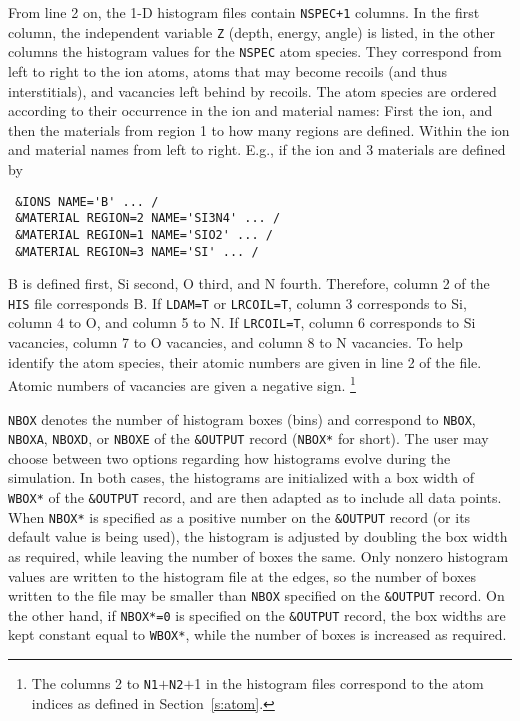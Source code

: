 From line 2 on, the 1-D histogram files contain \texttt{NSPEC+1} columns. In
the first column, the independent variable \texttt{Z} (depth, energy, angle) is 
listed, in the other columns the histogram values for the \texttt{NSPEC} atom
species. They correspond from left to right to the ion atoms, atoms that may
become recoils (and thus interstitials), and vacancies left behind by recoils.
The atom species are ordered according to their occurrence in the ion and
material names: First the ion, and then the materials from region 1 to how many
regions are defined. Within the ion and material names from left to right. 
E.g., if the ion and 3 materials are defined by 
%
\begin{verbatim}
 &IONS NAME='B' ... /
 &MATERIAL REGION=2 NAME='SI3N4' ... /
 &MATERIAL REGION=1 NAME='SIO2' ... /
 &MATERIAL REGION=3 NAME='SI' ... /
\end{verbatim}
%
B is defined first, Si second, O third, and N fourth. Therefore, column 2 of the
\texttt{HIS} file corresponds B. If \texttt{LDAM=T} or \texttt{LRCOIL=T}, column
3 corresponds to Si, column 4 to O, and column 5 to N. If \texttt{LRCOIL=T},
column 6 corresponds to Si vacancies, column 7 to O vacancies, and column 8 to N
vacancies. To help identify the atom species, their atomic numbers are given in
line 2 of the file. Atomic numbers of vacancies are given a negative sign.%
\footnote{The columns 2 to \texttt{N1}$+$\texttt{N2}$+$1 in the histogram files
correspond to the atom indices as defined in Section~\ref{s:atom}.}

\texttt{NBOX} denotes the number of histogram boxes (bins) and correspond to
\texttt{NBOX}, \texttt{NBOXA}, \texttt{NBOXD}, or \texttt{NBOXE} of the
\texttt{\&OUTPUT} record (\texttt{NBOX*} for short). The user may choose between
two options regarding how histograms evolve during the simulation. In both
cases, the histograms are initialized with a box width of \texttt{WBOX*} of the
\texttt{\&OUTPUT} record, and are then adapted as to include all data points.
When \texttt{NBOX*} is specified as a positive number on the \texttt{\&OUTPUT}
record (or its default value is being used), the histogram is adjusted by
doubling the box width as required, while leaving the number of boxes the same.
Only nonzero histogram values are written to the histogram file at the edges, so
the number of boxes written to the file may be smaller than \texttt{NBOX}
specified on the \texttt{\&OUTPUT} record. On the other hand, if
\texttt{NBOX*=0} is specified on the \texttt{\&OUTPUT} record, the box widths
are kept constant equal to \texttt{WBOX*}, while the number of boxes is
increased as required.

